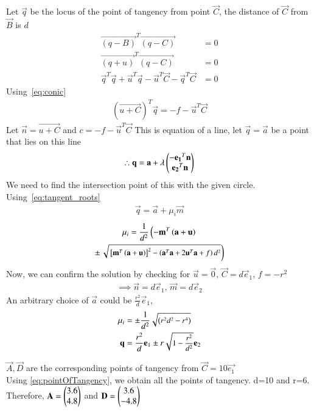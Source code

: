 \documentclass[journal,12pt,twocolumn]{IEEEtran}
\begin{document}
Let $\vec{q}$ be the locus of the point of tangency from point $\vec{C}$, the distance of $\vec{C}$ from $\vec{B}$ is $d$ 
\begin{align}
  \vec{(q-B)}^T\vec{(q-C)}&=0\\
  \vec{(q+u)}^T\vec{(q-C)}&=0\\
  \vec{q}^T\vec{q}+\vec{u}^T\vec{q}-\vec{u}^T\vec{C}-\vec{q}^T\vec{C}&=0
\end{align} 
Using~\eqref{eq:conic}
\begin{align}
  (\vec{u+C})^T\vec{q}=-f-\vec{u}^T\vec{C}
\end{align}
Let $\vec{n}=\vec{u+C}$ and $c=-f-\vec{u}^T\vec{C}$
This is equation of a line, let $\vec{q}=\vec{a}$ be a point that lies on this line
\begin{align}
  \therefore \mathbf{q}=\mathbf{a}+\lambda\begin{pmatrix}-\mathbf{e_1}^T\mathbf{n}\\\mathbf{e_2}^T\mathbf{n}\end{pmatrix}
\end{align}
We need to find the intersection point of this with the given circle.\\
Using~\eqref{eq:tangent_roots}
\begin{align}
  \vec{q} = \vec{a} + \mu_i \vec{m}
\end{align}
\begin{multline}
  \mu_i = \frac{1}
  {
  d^2
  }
  \left(-\mathbf{m}^T\left(\mathbf{a}+\mathbf{u}\right)\right.
  \\
  \pm
  {\small
  \ensuremath{\left.\sqrt{
  {}\left[
  \mathbf{m}^T\left(\mathbf{a}+\mathbf{u}\right)
  \right]^2
  -
  \left(
  \mathbf{a}^T\mathbf{a} + 2\mathbf{u}^T\mathbf{a} +f
  \right)
  d^2
  }
  \right)}
  }
\label{eq:sol}
\end{multline}
Now, we can confirm the solution by checking for $\vec{u}=\vec{0},\, \vec{C}=d\vec{e}_1,\, f=-r^2$
\begin{align}
  \implies \vec{n}=d\vec{e}_1,\, \vec{m}=d\vec{e}_2
\end{align}
An arbitrary choice of $\vec{a}$ could be $\frac{r^2}{d}\vec{e}_1$,
\begin{align}
  \mu_i &= \pm\frac{1}
  {
  d^2
  }
  {\small
  \sqrt{
  \left(r^2d^2-r^4\right)
  }
  }\\
  \mathbf{q}&=\frac{r^2}{d}\mathbf{e}_1 \pm r \small\sqrt{1-\frac{r^2}{d^2}}\mathbf{e}_2
  \label{eq:pointOfTangency}
\end{align}

$\vec{A}, \vec{D}$ are the corresponding points of tangency from $\vec{C}=10\vec{e_1}$ \\

Using \eqref{eq:pointOfTangency}, we obtain all the points of tangency. d=10 and r=6.\\
Therefore, $\mathbf{A} = \begin{pmatrix}3.6 \\ 4.8\end{pmatrix}$ and $\mathbf{D} = \begin{pmatrix}3.6 \\ -4.8\end{pmatrix}$ 
\end{document}
